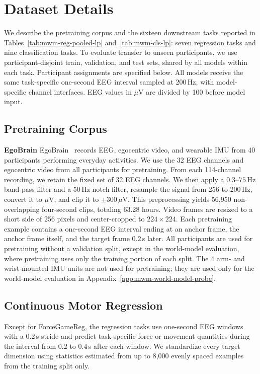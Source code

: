 \section{Dataset Details}
\label{app:mwm-dataset-details}

We describe the pretraining corpus and the sixteen downstream tasks reported in Tables~\ref{tab:mwm-reg-pooled-lp} and~\ref{tab:mwm-cls-lp}: seven regression tasks and nine classification tasks. To evaluate transfer to unseen participants, we use participant-disjoint train, validation, and test sets, shared by all models within each task. Participant assignments are specified below. All models receive the same task-specific one-second EEG interval sampled at 200\,Hz, with model-specific channel interfaces. EEG values in $\mu$V are divided by 100 before model input.

\subsection{Pretraining Corpus}

\noindent\textbf{EgoBrain}
EgoBrain~\citep{lin2026egobrain} records EEG, egocentric video, and wearable IMU from 40 participants performing everyday activities. We use the 32 EEG channels and egocentric video from all participants for pretraining. From each 114-channel recording, we retain the fixed set of 32 EEG channels. We then apply a $0.3$--$75$\,Hz band-pass filter and a 50\,Hz notch filter, resample the signal from 256 to 200\,Hz, convert it to $\mu$V, and clip it to $\pm300\,\mu$V. This preprocessing yields 56,950 non-overlapping four-second clips, totaling 63.28 hours. Video frames are resized to a short side of 256 pixels and center-cropped to $224\times224$. Each pretraining example contains a one-second EEG interval ending at an anchor frame, the anchor frame itself, and the target frame $0.2$\,s later. All participants are used for pretraining without a validation split, except in the world-model evaluation, where pretraining uses only the training portion of each split. The 4 arm- and wrist-mounted IMU units are not used for pretraining; they are used only for the world-model evaluation in Appendix~\ref{app:mwm-world-model-probe}.

\subsection{Continuous Motor Regression}

Except for ForceGameReg, the regression tasks use one-second EEG windows with a $0.2$\,s stride and predict task-specific force or movement quantities during the interval from $0.2$ to $0.4$\,s after each window. We standardize every target dimension using statistics estimated from up to 8,000 evenly spaced examples from the training split only.

